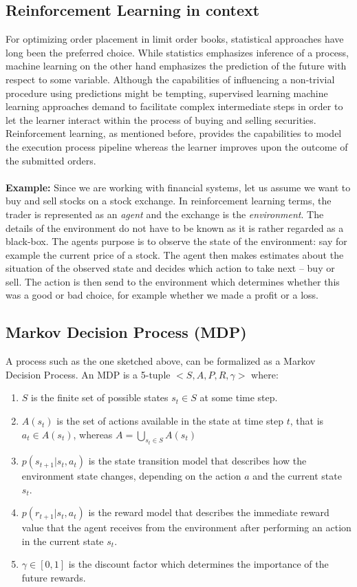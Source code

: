 \subsection{Reinforcement Learning in context}
For optimizing order placement in limit order books, statistical approaches have long been the preferred choice.
While statistics emphasizes inference of a process, machine learning on the other hand emphasizes the prediction of the future with respect to some variable.
Although the capabilities of influencing a non-trivial procedure using predictions might be tempting, supervised learning machine learning approaches demand to facilitate complex intermediate steps in order to let the learner interact within the process of buying and selling securities.
Reinforcement learning, as mentioned before, provides the capabilities to model the execution process pipeline whereas the learner improves upon the outcome of the submitted orders. \cite{deeprlcourse}
\\
\\
\textbf{Example:} Since we are working with financial systems, let us assume we want to buy and sell stocks on a stock exchange. 
In reinforcement learning terms, the trader is represented as an \textit{agent} and the exchange is the \textit{environment}.
The details of the environment do not have to be known as it is rather regarded as a black-box.
The agents purpose is to observe the state of the environment: say for example the current price of a stock.
The agent then makes estimates about the situation of the observed state and decides which action to take next – buy or sell. 
The action is then send to the environment which determines whether this was a good or bad choice, for example whether we made a profit or a loss.

\subsection{Markov Decision Process (MDP)}
\label{rl-mdp}

A process such as the one sketched above, can be formalized as a Markov Decision Process.
An MDP is a 5-tuple $<S, A, P, R, \gamma >$ where:
\begin{enumerate}
    \item $S$ is the finite set of possible states $s_t \in S$ at some time step.
    \item $A(s_t)$ is the set of actions available in the state at time step $t$, that is $a_t \in A(s_t)$, whereas $A=\bigcup_{s_t \in S} A(s_t)$
    \item $p(s_{t+1} | s_t, a_t)$ is the state transition model that describes how the environment state changes, depending on the action $a$ and the current state $s_t$.
    \item $p(r_{t+1} | s_t, a_t)$ is the reward model that describes the immediate reward value that the agent receives from the environment after performing an action in the current state $s_t$.
    \item $\gamma \in [0,1]$ is the discount factor which determines the importance of the future rewards.
\end{enumerate}

